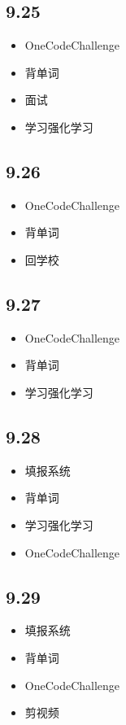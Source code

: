 \documentclass[UTF8]{ctexart}
\begin{document}
\subsection*{9.25}
\begin{itemize}
    \item OneCodeChallenge
    \item 背单词
    \item 面试
    \item 学习强化学习
\end{itemize}

\subsection*{9.26}
\begin{itemize}
    \item OneCodeChallenge
    \item 背单词
    \item 回学校
\end{itemize}

\subsection*{9.27}
\begin{itemize}
    \item OneCodeChallenge
    \item 背单词
    \item 学习强化学习
\end{itemize}

\subsection*{9.28}
\begin{itemize}
    \item 填报系统
    \item 背单词
    \item 学习强化学习
    \item OneCodeChallenge
\end{itemize}

\subsection*{9.29}
\begin{itemize}
    \item 填报系统
    \item 背单词
    \item OneCodeChallenge
    \item 剪视频
\end{itemize}
\end{document}
